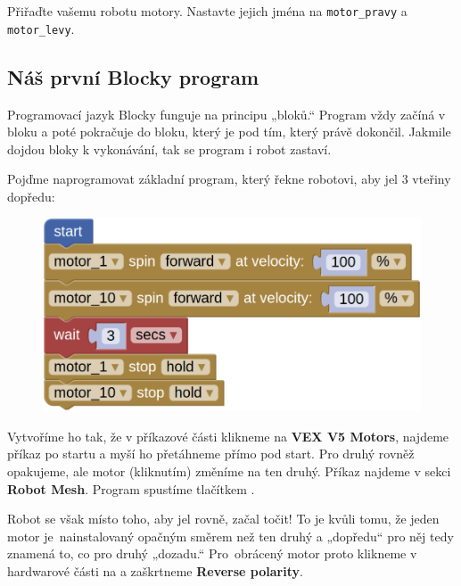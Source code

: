 \documentclass[main.tex]{subfiles}
\begin{document}
	\begin{question}
		Přiřaďte vašemu robotu motory. Nastavte jejich jména na \texttt{motor\_pravy} a \texttt{motor\_levy}.
	\end{question}

	\subsection{Náš první Blocky program}

	Programovací jazyk Blocky funguje na principu „bloků.“ Program vždy začíná v bloku \blockStartImage a poté pokračuje do bloku, který je pod tím, který právě dokončil. Jakmile dojdou bloky k vykonávání, tak se program i robot zastaví.

	Pojďme naprogramovat základní program, který řekne robotovi, aby jel $3$ vteřiny dopředu:

	\begin{figure}[h!]
		\centering
		\begin{minipage}{0.5\textwidth}
			\includegraphics[width=\linewidth]{Images/01/program-1.png}
		\end{minipage}
	\end{figure}

	Vytvoříme ho tak, že v příkazové části klikneme na \textbf{VEX V5 Motors}, najdeme příkaz po startu a myší ho přetáhneme přímo pod start. Pro druhý rovněž opakujeme, ale motor (kliknutím) změníme na ten druhý. Příkaz \blockWaitImage najdeme v sekci \textbf{Robot Mesh}. Program spustíme tlačítkem .

	Robot se však místo toho, aby jel rovně, začal točit! To je kvůli tomu, že jeden motor je~\mbox{nainstalovaný} opačným směrem než ten druhý a „dopředu“ pro něj tedy znamená to, co pro druhý „dozadu.“ Pro~obrácený motor proto klikneme v hardwarové části na  a zaškrtneme \textbf{Reverse polarity}.
\end{document}
